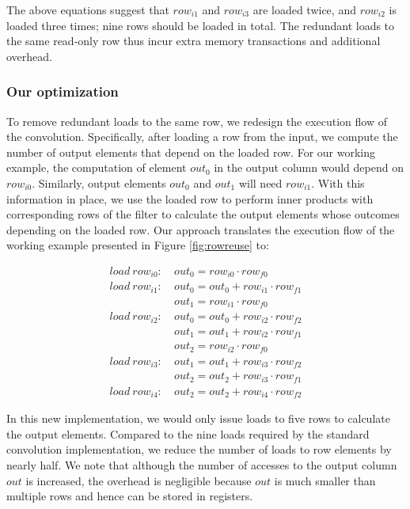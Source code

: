 The above equations suggest that $row_{i1}$ and $row_{i3}$ are loaded twice, and $row_{i2}$ is loaded three times; nine rows should be loaded in total.
The redundant loads to the same read-only row thus incur extra memory transactions and additional overhead.

\subsubsection{Our optimization}
To remove redundant loads to the same row, we redesign the execution flow of the convolution.
Specifically, after loading a row from the input, we compute the number of output elements that depend on the loaded row.
For our working example, the computation of element $out_0$ in the output column would depend on $row_{i0}$.
Similarly, output elements $out_0$ and $out_1$ will need $row_{i1}$. With this information in place, we use the loaded row to perform inner products with corresponding rows of the filter to calculate the output elements whose outcomes depending on the loaded row.
Our approach translates the execution flow of the working example presented in Figure \ref {fig:rowreuse} to:

\begin{equation}\nonumber
\begin{aligned}
load\ row_{i0}:
&\ out_0=row_{i0} \cdot row_{f0} \\
load\ row_{i1}:
&\ out_0 = out_0+row_{i1} \cdot row_{f1}\\
&\ out_1=row_{i1} \cdot row_{f0}\\
load\ row_{i2}:
&\ out_0 = out_0+row_{i2} \cdot row_{f2}\\
&\ out_1 = out_1+row_{i2} \cdot row_{f1}\\
&\ out_{2}=row_{i2} \cdot row_{f0}\\
load\ row_{i3}:
&\ out_1=out_1+row_{i3} \cdot row_{f2} \\
&\ out_2=out_2+row_{i3} \cdot row_{f1}\\
load\ row_{i4}:
&\ out_2=out_2+row_{i4} \cdot row_{f2}
\end{aligned}	
\end{equation}

In this new implementation, we would only issue loads to five rows to calculate the output elements.
Compared to the nine loads required by the standard convolution implementation, we reduce the number of loads to row elements by nearly half.
We note that although the number of accesses to the output column $out$ is increased, the overhead is negligible because $out$ is much smaller than multiple rows and hence can be stored in registers.

